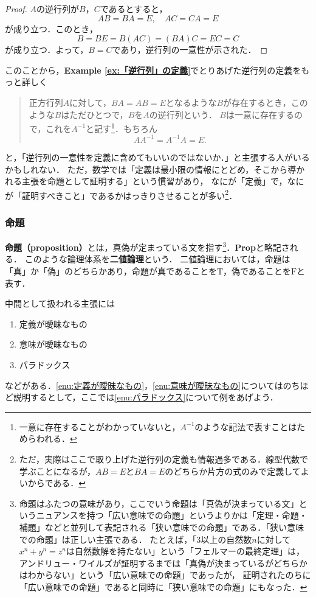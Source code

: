 \documentclass[a4paper,11pt]{ltjsarticle}
\renewcommand{\emph}[1]{\textbf{#1}}
\newenvironment{tleftbar}{\begin{tbleftline}\setlength{\parindent}{1\zw}}{\end{tbleftline}}
\newcommand{\exref}[1]{{\bfseries\sffamily Example \ref{ex:#1}}}
\begin{document}
\begin{tleftbar}
	\begin{proof}
	$A$の逆行列が$B$，$C$であるとすると，
	\[
		AB=BA=E,\quad AC=CA=E
	\]
	が成り立つ．このとき，
	\[
		B=BE=B(AC)=(BA)C=EC=C
	\]
	が成り立つ．よって，$B=C$であり，逆行列の一意性が示された．
	\end{proof}
\end{tleftbar}

このことから，\exref{「逆行列」の定義}でとりあげた逆行列の定義をもっと詳しく

\begin{quote}
	正方行列$A$に対して，$BA = AB =E$となるような$B$が存在するとき，このような$B$はただひとつで，$B$を$A$の逆行列という．
	$B$は一意に存在するので，これを$A^{-1}$と記す\footnote{一意に存在することがわかっていないと，$A^{-1}$のような記法で表すことはためらわれる．}．もちろん
	\[
		AA^{-1}=A^{-1}A=E.
	\]
\end{quote}
と，「逆行列の一意性を定義に含めてもいいのではないか．」と主張する人がいるかもしれない．
ただ，数学では「定義は最小限の情報にとどめ，そこから導かれる主張を命題として証明する」という慣習があり，
なにが「定義」で，なにが「証明すべきこと」であるかはっきりさせることが多い\footnote{ただ，実際はここで取り上げた逆行列の定義も情報過多である．線型代数で学ぶことになるが，$AB=E$と$BA=E$のどちらか片方の式のみで定義してよいからである．}．

\subsubsection{命題}

\emph{命題（proposition）}とは，真偽が定まっている文を指す\footnote{命題はふたつの意味があり，ここでいう命題は「真偽が決まっている文」というニュアンスを持つ「広い意味での命題」というよりかは「定理・命題・補題」などと並列して表記される「狭い意味での命題」である．「狭い意味での命題」は正しい主張である．
	たとえば，「$3$以上の自然数$n$に対して$x^n + y^n =z^n$は自然数解を持たない」という「フェルマーの最終定理」は，
	アンドリュー・ワイルズが証明するまでは「真偽が決まっているがどちらかはわからない」という「広い意味での命題」であったが，
	証明されたのちに「広い意味での命題」であると同時に「狭い意味での命題」にもなった．}．\textbf{Prop}と略記される．
このような論理体系を\emph{二値論理}という．
二値論理においては，命題は「真」か「偽」のどちらかあり，命題が真であることを$\mathrm{T}$，偽であることを$\mathrm{F}$と表す．

中間として扱われる主張には
\begin{enumerate}[(1)]
	\item 定義が曖昧なもの \label{enu:定義が曖昧なもの}
	\item 意味が曖昧なもの \label{enu:意味が曖昧なもの}
	\item パラドックス \label{enu:パラドックス}
\end{enumerate}
などがある．\ref{enu:定義が曖昧なもの}，\ref{enu:意味が曖昧なもの}についてはのちほど説明するとして，ここでは\ref{enu:パラドックス}について例をあげよう．
\end{document}
